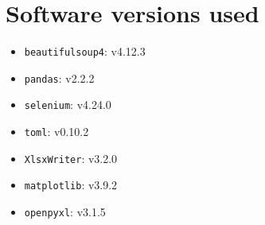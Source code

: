 \section{Software versions used}
\begin{itemize}
    \item \texttt{beautifulsoup4}: v4.12.3
    \item \texttt{pandas}: v2.2.2
    \item \texttt{selenium}: v4.24.0
    \item \texttt{toml}: v0.10.2
    \item \texttt{XlsxWriter}: v3.2.0
    \item \texttt{matplotlib}: v3.9.2
    \item \texttt{openpyxl}: v3.1.5
\end{itemize}